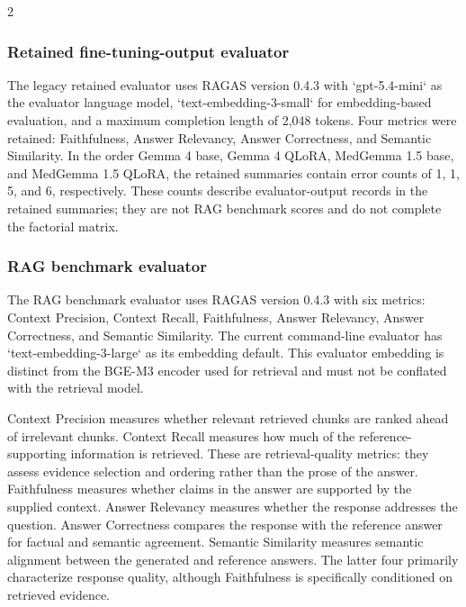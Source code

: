 \documentclass[11pt]{article}
\begin{document}
\begin{multicols}{2}
\subsubsection{Retained fine-tuning-output evaluator}

The legacy retained evaluator uses RAGAS version 0.4.3 \cite{Es2023Ragas} with `gpt-5.4-mini` as the evaluator language model, `text-embedding-3-small` for embedding-based evaluation, and a maximum completion length of 2,048 tokens. Four metrics were retained: Faithfulness, Answer Relevancy, Answer Correctness, and Semantic Similarity. In the order Gemma 4 base, Gemma 4 QLoRA, MedGemma 1.5 base, and MedGemma 1.5 QLoRA, the retained summaries contain error counts of 1, 1, 5, and 6, respectively. These counts describe evaluator-output records in the retained summaries; they are not RAG benchmark scores and do not complete the factorial matrix.

\subsubsection{RAG benchmark evaluator}

The RAG benchmark evaluator uses RAGAS version 0.4.3 \cite{Es2023Ragas} with six metrics: Context Precision, Context Recall, Faithfulness, Answer Relevancy, Answer Correctness, and Semantic Similarity. The current command-line evaluator has `text-embedding-3-large` as its embedding default. This evaluator embedding is distinct from the BGE-M3 encoder used for retrieval and must not be conflated with the retrieval model.

Context Precision measures whether relevant retrieved chunks are ranked ahead of irrelevant chunks. Context Recall measures how much of the reference-supporting information is retrieved. These are retrieval-quality metrics: they assess evidence selection and ordering rather than the prose of the answer. Faithfulness measures whether claims in the answer are supported by the supplied context. Answer Relevancy measures whether the response addresses the question. Answer Correctness compares the response with the reference answer for factual and semantic agreement. Semantic Similarity measures semantic alignment between the generated and reference answers. The latter four primarily characterize response quality, although Faithfulness is specifically conditioned on retrieved evidence.


\end{multicols}
\end{document}
